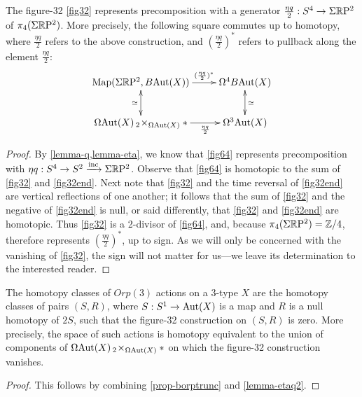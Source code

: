 \documentclass{amsart}
\begin{document}
\begin{lemma} 
\label{lemma-etaq2}
The figure-32 \cref{fig32} represents precomposition with a generator $\frac{\eta q}{2}: S^4 \rightarrow \Sigma \mathbb R \mathrm{P}^2$ of $\pi_4(\Sigma \mathbb R \mathrm{P}^2)$.  More precisely, the following square commutes up to homotopy, where $\frac{\eta q}{2}$ refers to the above construction, and $(\frac{\eta q}{2})^\ast$ refers to pullback along the element $\frac{\eta q}{2}$:
\[
\xymatrix{
\Map(\Sigma \RP^2,B\Aut(X)) \ar[r]^-{(\frac{\eta q}{2})^\ast} \ar@{<->}[d]_{\simeq} & \Omega^4 B\Aut(X)  \ar@{<->}[d]^{\simeq} \\
\Omega\Aut(X) \,_2\! \times_{\Omega \Aut(X)} \ast \ar[r]_-{\frac{\eta q}{2}} & \Omega^3 \Aut(X)
}
\]
\end{lemma}
\begin{proof}
By \cref{lemma-q,lemma-eta}, we know that \cref{fig64} represents precomposition with $\eta q : S^4 \rightarrow S^2 \xrightarrow{\text{inc}} \Sigma\mathbb R \mathrm{P}^2$.  Observe that \cref{fig64} is homotopic to the sum of \cref{fig32} and \cref{fig32end}. Next note that \cref{fig32} and the time reversal of \cref{fig32end} are vertical reflections of one another; it follows that the sum of \cref{fig32} and the negative of \cref{fig32end} is null, or said differently, that \cref{fig32} and \cref{fig32end} are homotopic.  Thus \cref{fig32} is a 2-divisor of \cref{fig64}, and, because $\pi_4(\Sigma \mathbb R \mathrm{P}^2) = \mathbb Z/4$, therefore represents $(\frac{\eta q}{2})^\ast$, up to sign.  As we will only be concerned with the vanishing of \cref{fig32}, the sign will not matter for us---we leave its determination to the interested reader.
\end{proof}

\begin{proposition} 
\label{prop-orpaction}
The homotopy classes of $Orp(3)$ actions on a 3-type $X$ are the homotopy classes of pairs $(S,R)$, where $S: S^1 \rightarrow \mathrm{Aut}(X)$ is a map and $R$ is a null homotopy of $2S$, such that the figure-32 construction on $(S,R)$ is zero.  More precisely, the space of such actions is homotopy equivalent to the union of components of $\Omega \mathrm{Aut}(X) \,_2\! \times_{\Omega \mathrm{Aut}(X)} \ast$ on which the figure-32 construction vanishes.
\end{proposition}
\begin{proof}
This follows by combining \cref{prop-borptrunc} and \cref{lemma-etaq2}.
\end{proof}
\end{document}
